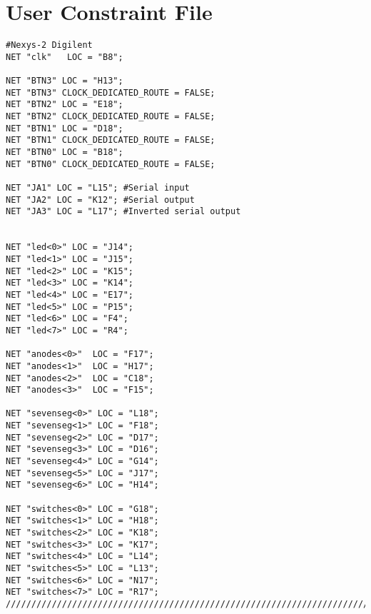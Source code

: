 \section{User Constraint File}
\label{sec:toplevel}
\begin{lstlisting}[style=verilog-style,basicstyle=\tiny]
#Nexys-2 Digilent
NET "clk"   LOC = "B8";

NET "BTN3" LOC = "H13";
NET "BTN3" CLOCK_DEDICATED_ROUTE = FALSE;
NET "BTN2" LOC = "E18";
NET "BTN2" CLOCK_DEDICATED_ROUTE = FALSE;
NET "BTN1" LOC = "D18";
NET "BTN1" CLOCK_DEDICATED_ROUTE = FALSE;
NET "BTN0" LOC = "B18";
NET "BTN0" CLOCK_DEDICATED_ROUTE = FALSE;

NET "JA1" LOC = "L15"; #Serial input
NET "JA2" LOC = "K12"; #Serial output
NET "JA3" LOC = "L17"; #Inverted serial output


NET "led<0>" LOC = "J14";
NET "led<1>" LOC = "J15";
NET "led<2>" LOC = "K15";
NET "led<3>" LOC = "K14";
NET "led<4>" LOC = "E17";
NET "led<5>" LOC = "P15";
NET "led<6>" LOC = "F4";
NET "led<7>" LOC = "R4";

NET "anodes<0>"  LOC = "F17"; 
NET "anodes<1>"  LOC = "H17"; 
NET "anodes<2>"  LOC = "C18"; 
NET "anodes<3>"  LOC = "F15"; 
 
NET "sevenseg<0>" LOC = "L18"; 
NET "sevenseg<1>" LOC = "F18"; 
NET "sevenseg<2>" LOC = "D17"; 
NET "sevenseg<3>" LOC = "D16"; 
NET "sevenseg<4>" LOC = "G14"; 
NET "sevenseg<5>" LOC = "J17"; 
NET "sevenseg<6>" LOC = "H14"; 

NET "switches<0>" LOC = "G18"; 
NET "switches<1>" LOC = "H18"; 
NET "switches<2>" LOC = "K18";
NET "switches<3>" LOC = "K17";
NET "switches<4>" LOC = "L14"; 
NET "switches<5>" LOC = "L13"; 
NET "switches<6>" LOC = "N17";
NET "switches<7>" LOC = "R17";
//////////////////////////////////////////////////////////////////////////////////
\end{lstlisting}
